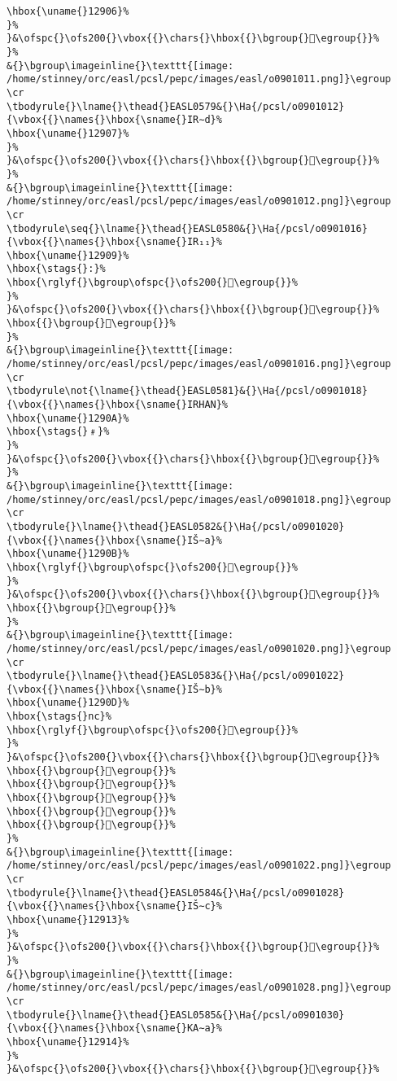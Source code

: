 \begin{verbatim}
\hbox{\uname{}12906}%
}%
}&\ofspc{}\ofs200{}\vbox{{}\chars{}\hbox{{}\bgroup{}𒤆\egroup{}}%
}%
&{}\bgroup\imageinline{}\texttt{[image: /home/stinney/orc/easl/pcsl/pepc/images/easl/o0901011.png]}\egroup
\cr
\tbodyrule{}\lname{}\thead{}EASL0579&{}\Ha{/pcsl/o0901012}{\vbox{{}\names{}\hbox{\sname{}IR∼d}%
\hbox{\uname{}12907}%
}%
}&\ofspc{}\ofs200{}\vbox{{}\chars{}\hbox{{}\bgroup{}𒤇\egroup{}}%
}%
&{}\bgroup\imageinline{}\texttt{[image: /home/stinney/orc/easl/pcsl/pepc/images/easl/o0901012.png]}\egroup
\cr
\tbodyrule\seq{}\lname{}\thead{}EASL0580&{}\Ha{/pcsl/o0901016}{\vbox{{}\names{}\hbox{\sname{}IR₁₁}%
\hbox{\uname{}12909}%
\hbox{\stags{}:}%
\hbox{\rglyf{}\bgroup\ofspc{}\ofs200{}𒤉\egroup{}}%
}%
}&\ofspc{}\ofs200{}\vbox{{}\chars{}\hbox{{}\bgroup{}𒤈\egroup{}}%
\hbox{{}\bgroup{}𒤉\egroup{}}%
}%
&{}\bgroup\imageinline{}\texttt{[image: /home/stinney/orc/easl/pcsl/pepc/images/easl/o0901016.png]}\egroup
\cr
\tbodyrule\not{\lname{}\thead{}EASL0581}&{}\Ha{/pcsl/o0901018}{\vbox{{}\names{}\hbox{\sname{}IRHAN}%
\hbox{\uname{}1290A}%
\hbox{\stags{}﹟}%
}%
}&\ofspc{}\ofs200{}\vbox{{}\chars{}\hbox{{}\bgroup{}𒤊\egroup{}}%
}%
&{}\bgroup\imageinline{}\texttt{[image: /home/stinney/orc/easl/pcsl/pepc/images/easl/o0901018.png]}\egroup
\cr
\tbodyrule{}\lname{}\thead{}EASL0582&{}\Ha{/pcsl/o0901020}{\vbox{{}\names{}\hbox{\sname{}IŠ∼a}%
\hbox{\uname{}1290B}%
\hbox{\rglyf{}\bgroup\ofspc{}\ofs200{}𒤋\egroup{}}%
}%
}&\ofspc{}\ofs200{}\vbox{{}\chars{}\hbox{{}\bgroup{}𒤌\egroup{}}%
\hbox{{}\bgroup{}𒤋\egroup{}}%
}%
&{}\bgroup\imageinline{}\texttt{[image: /home/stinney/orc/easl/pcsl/pepc/images/easl/o0901020.png]}\egroup
\cr
\tbodyrule{}\lname{}\thead{}EASL0583&{}\Ha{/pcsl/o0901022}{\vbox{{}\names{}\hbox{\sname{}IŠ∼b}%
\hbox{\uname{}1290D}%
\hbox{\stags{}nc}%
\hbox{\rglyf{}\bgroup\ofspc{}\ofs200{}𒤍\egroup{}}%
}%
}&\ofspc{}\ofs200{}\vbox{{}\chars{}\hbox{{}\bgroup{}𒤍\egroup{}}%
\hbox{{}\bgroup{}𒤎\egroup{}}%
\hbox{{}\bgroup{}𒤏\egroup{}}%
\hbox{{}\bgroup{}𒤐\egroup{}}%
\hbox{{}\bgroup{}𒤑\egroup{}}%
\hbox{{}\bgroup{}𒤒\egroup{}}%
}%
&{}\bgroup\imageinline{}\texttt{[image: /home/stinney/orc/easl/pcsl/pepc/images/easl/o0901022.png]}\egroup
\cr
\tbodyrule{}\lname{}\thead{}EASL0584&{}\Ha{/pcsl/o0901028}{\vbox{{}\names{}\hbox{\sname{}IŠ∼c}%
\hbox{\uname{}12913}%
}%
}&\ofspc{}\ofs200{}\vbox{{}\chars{}\hbox{{}\bgroup{}𒤓\egroup{}}%
}%
&{}\bgroup\imageinline{}\texttt{[image: /home/stinney/orc/easl/pcsl/pepc/images/easl/o0901028.png]}\egroup
\cr
\tbodyrule{}\lname{}\thead{}EASL0585&{}\Ha{/pcsl/o0901030}{\vbox{{}\names{}\hbox{\sname{}KA∼a}%
\hbox{\uname{}12914}%
}%
}&\ofspc{}\ofs200{}\vbox{{}\chars{}\hbox{{}\bgroup{}𒤔\egroup{}}%

\end{verbatim}
